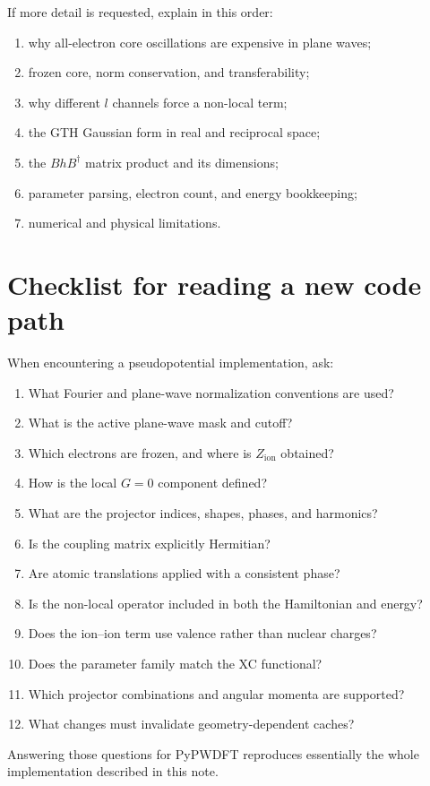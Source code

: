 \documentclass[10pt,twocolumn]{article}
\newcommand{\zion}{Z_{\mathrm{ion}}}
\begin{document}
If more detail is requested, explain in this order:
\begin{enumerate}
  \item why all-electron core oscillations are expensive in plane waves;
  \item frozen core, norm conservation, and transferability;
  \item why different \(l\) channels force a non-local term;
  \item the GTH Gaussian form in real and reciprocal space;
  \item the \(B h B^\dagger\) matrix product and its dimensions;
  \item parameter parsing, electron count, and energy bookkeeping;
  \item numerical and physical limitations.
\end{enumerate}

\section{Checklist for reading a new code path}

When encountering a pseudopotential implementation, ask:
\begin{enumerate}
  \item What Fourier and plane-wave normalization conventions are used?
  \item What is the active plane-wave mask and cutoff?
  \item Which electrons are frozen, and where is \(\zion\) obtained?
  \item How is the local \(G=0\) component defined?
  \item What are the projector indices, shapes, phases, and harmonics?
  \item Is the coupling matrix explicitly Hermitian?
  \item Are atomic translations applied with a consistent phase?
  \item Is the non-local operator included in both the Hamiltonian and energy?
  \item Does the ion--ion term use valence rather than nuclear charges?
  \item Does the parameter family match the XC functional?
  \item Which projector combinations and angular momenta are supported?
  \item What changes must invalidate geometry-dependent caches?
\end{enumerate}
Answering those questions for PyPWDFT reproduces essentially the whole
implementation described in this note.
\end{document}
